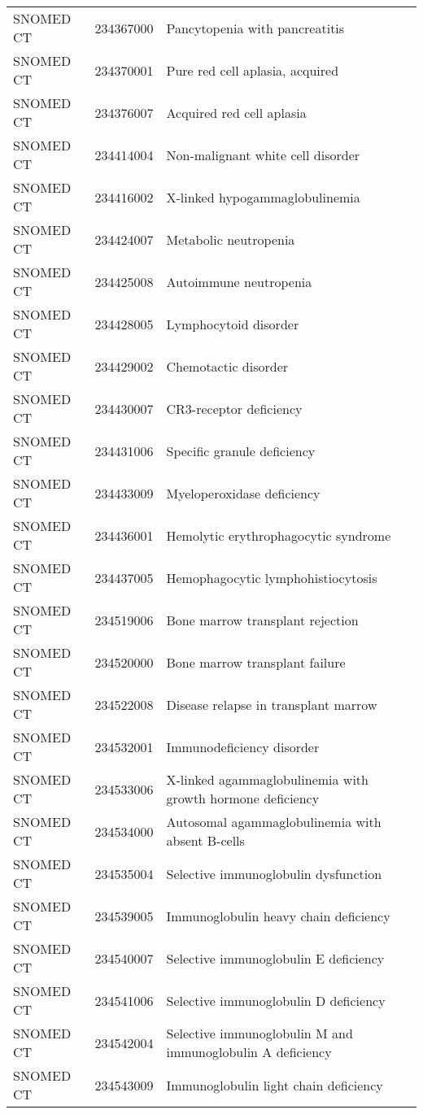 \begin{table}[ht]
\begin{tabular}{lll}
  SNOMED CT & 234367000 & Pancytopenia with pancreatitis \\ 
  SNOMED CT & 234370001 & Pure red cell aplasia, acquired \\ 
  SNOMED CT & 234376007 & Acquired red cell aplasia \\ 
  SNOMED CT & 234414004 & Non-malignant white cell disorder \\ 
  SNOMED CT & 234416002 & X-linked hypogammaglobulinemia \\ 
  SNOMED CT & 234424007 & Metabolic neutropenia \\ 
  SNOMED CT & 234425008 & Autoimmune neutropenia \\ 
  SNOMED CT & 234428005 & Lymphocytoid disorder \\ 
  SNOMED CT & 234429002 & Chemotactic disorder \\ 
  SNOMED CT & 234430007 & CR3-receptor deficiency \\ 
  SNOMED CT & 234431006 & Specific granule deficiency \\ 
  SNOMED CT & 234433009 & Myeloperoxidase deficiency \\ 
  SNOMED CT & 234436001 & Hemolytic erythrophagocytic syndrome \\ 
  SNOMED CT & 234437005 & Hemophagocytic lymphohistiocytosis \\ 
  SNOMED CT & 234519006 & Bone marrow transplant rejection \\ 
  SNOMED CT & 234520000 & Bone marrow transplant failure \\ 
  SNOMED CT & 234522008 & Disease relapse in transplant marrow \\ 
  SNOMED CT & 234532001 & Immunodeficiency disorder \\ 
  SNOMED CT & 234533006 & X-linked agammaglobulinemia with growth hormone deficiency \\ 
  SNOMED CT & 234534000 & Autosomal agammaglobulinemia with absent B-cells \\ 
  SNOMED CT & 234535004 & Selective immunoglobulin dysfunction \\ 
  SNOMED CT & 234539005 & Immunoglobulin heavy chain deficiency \\ 
  SNOMED CT & 234540007 & Selective immunoglobulin E deficiency \\ 
  SNOMED CT & 234541006 & Selective immunoglobulin D deficiency \\ 
  SNOMED CT & 234542004 & Selective immunoglobulin M and immunoglobulin A deficiency \\ 
  SNOMED CT & 234543009 & Immunoglobulin light chain deficiency \\ 

\end{tabular}
\end{table}
